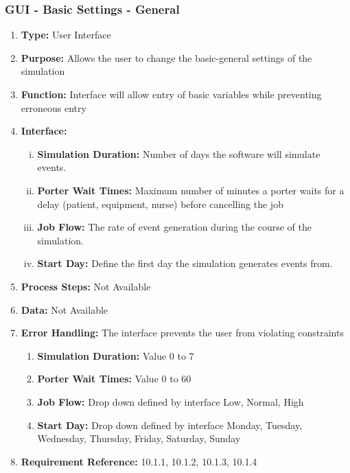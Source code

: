 \documentclass[paper=letter, fontsize=10pt]{scrartcl}
\numberwithin{equation}{section}		%
\numberwithin{figure}{section}			%
\numberwithin{table}{section}				%
\begin{document}
\subsubsection{GUI - Basic Settings - General}
\begin{enumerate}[]
	\item \textbf{Type:} User Interface
	\item \textbf{Purpose:} Allows the user to change the basic-general settings of the simulation
	\item \textbf{Function:} Interface will allow entry of basic variables while preventing erroneous entry
	\item \textbf{Interface:} 
	\begin{enumerate}[(i)]
		\item \textbf{Simulation Duration:} Number of days the software will simulate events.
		\item \textbf{Porter Wait Times:} Maximum number of minutes a porter waits for a delay (patient, equipment, nurse) before cancelling the job
		\item \textbf{Job Flow:} The rate of event generation during the course of the simulation.
		\item \textbf{Start Day:} Define the first day the simulation generates events from.
	\end{enumerate}
	\item \textbf{Process Steps:} Not Available
	\item \textbf{Data:} Not Available
	\item \textbf{Error Handling:} The interface prevents the user from violating constraints
	\begin{enumerate}[]
		\item \textbf{Simulation Duration:} Value 0 to 7 
		\item \textbf{Porter Wait Times:} Value 0 to 60
		\item \textbf{Job Flow:} Drop down defined by interface {Low, Normal, High}
		\item \textbf{Start Day:} Drop down defined by interface {Monday, Tuesday, Wednesday, Thursday, Friday, Saturday, Sunday}   
	\end{enumerate}
	\item \textbf{Requirement Reference:} 10.1.1, 10.1.2, 10.1.3, 10.1.4
\end{enumerate}
\end{document}
